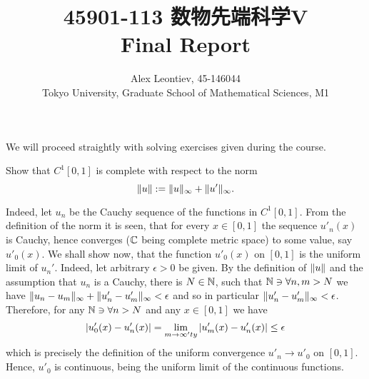 \documentclass[10pt]{article} %
\title{45901-113 数物先端科学V\\Final Report}
\author{Alex Leontiev, 45-146044
\\Tokyo University, Graduate School of Mathematical Sciences, M1}
\begin{document}
\begin{CJK}{UTF8}{bsmi}
\maketitle
\end{CJK}
We will proceed straightly with solving exercises given during the course.
\begin{myprob}[Oct 8]Show that $C^1[0,1]$ is complete with respect to the norm
\[\|u\|:=\|u\|_\infty+\|u'\|_\infty.\]
\end{myprob}
Indeed, let $u_n$ be the Cauchy sequence of the functions in $C^1[0,1]$. From the definition
of the norm it is seen, that for every $x\in[0,1]$ the sequence $u'_n(x)$ is Cauchy, hence converges
($\mathbb{C}$ being complete metric space) to some value, say $u'_0(x)$. We shall show now, that the function $u'_0(x)$ on $[0,1]$ is
the uniform limit of $u_n'$. Indeed, let arbitrary $\epsilon>0$ be given. By the definition of $\|u\|$ and the assumption
that $u_n$ is a Cauchy, there is $N\in\mathbb{N}$, such that $ \mathbb{N}\ni\forall n,m>N$ we have
$\|u_n-u_m\|_\infty+\|u'_n-u'_m\|_\infty<\epsilon$ and so in particular
$\|u'_n-u'_m\|_\infty<\epsilon$. Therefore, for any $\mathbb{N}\ni\forall n>N$ and any $x\in[0,1]$ we have
\[\myabs{u_0'(x)-u'_n(x)}=\lim_{m\to\infty'ty}\myabs{u'_m(x)-u'_n(x)}\leq\epsilon\]
which is precisely the definition of the uniform convergence $u'_n\to u'_0$ on $[0,1]$. Hence, $u'_0$ is continuous, being
the uniform limit of the continuous functions.
\end{document}
